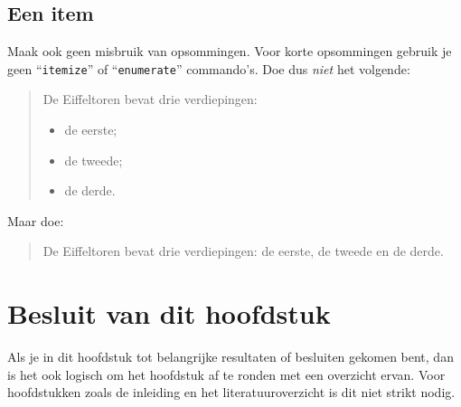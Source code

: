 \subsection{Een item}
Maak ook geen misbruik van opsommingen. Voor korte opsommingen gebruik je
geen ``\verb|itemize|'' of ``\texttt{enumerate}'' commando's. Doe dus
\emph{niet} het volgende:
\begin{quote}
  De Eiffeltoren bevat drie verdiepingen:
  \begin{itemize}
  \item de eerste;
  \item de tweede;
  \item de derde.
  \end{itemize}
\end{quote}
Maar doe:
\begin{quote}
  De Eiffeltoren bevat drie verdiepingen: de eerste, de tweede en de derde.
\end{quote}

\section{Besluit van dit hoofdstuk}
Als je in dit hoofdstuk tot belangrijke resultaten of besluiten gekomen
bent, dan is het ook logisch om het hoofdstuk af te ronden met een
overzicht ervan. Voor hoofdstukken zoals de inleiding en het
literatuuroverzicht is dit niet strikt nodig.

